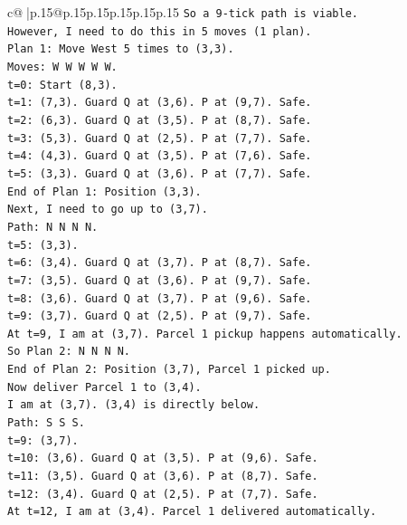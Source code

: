 \documentclass{article}
\begin{document}
{\begin{supertabular}{c@{$\;$}|p{.15\linewidth}@{}p{.15\linewidth}p{.15\linewidth}p{.15\linewidth}p{.15\linewidth}p{.15\linewidth}}
{{{\texttt{So a 9{-}tick path is viable.} \\
\texttt{However, I need to do this in 5 moves (1 plan).} \\
\texttt{Plan 1: Move West 5 times to (3,3).} \\
\texttt{Moves: W W W W W.} \\
\texttt{t=0: Start (8,3).} \\
\texttt{t=1: (7,3). Guard Q at (3,6). P at (9,7). Safe.} \\
\texttt{t=2: (6,3). Guard Q at (3,5). P at (8,7). Safe.} \\
\texttt{t=3: (5,3). Guard Q at (2,5). P at (7,7). Safe.} \\
\texttt{t=4: (4,3). Guard Q at (3,5). P at (7,6). Safe.} \\
\texttt{t=5: (3,3). Guard Q at (3,6). P at (7,7). Safe.} \\
\texttt{End of Plan 1: Position (3,3).} \\
\texttt{Next, I need to go up to (3,7).} \\
\texttt{Path: N N N N.} \\
\texttt{t=5: (3,3).} \\
\texttt{t=6: (3,4). Guard Q at (3,7). P at (8,7). Safe.} \\
\texttt{t=7: (3,5). Guard Q at (3,6). P at (9,7). Safe.} \\
\texttt{t=8: (3,6). Guard Q at (3,7). P at (9,6). Safe.} \\
\texttt{t=9: (3,7). Guard Q at (2,5). P at (9,7). Safe.} \\
\texttt{At t=9, I am at (3,7). Parcel 1 pickup happens automatically.} \\
\texttt{So Plan 2: N N N N.} \\
\texttt{End of Plan 2: Position (3,7), Parcel 1 picked up.} \\
\texttt{Now deliver Parcel 1 to (3,4).} \\
\texttt{I am at (3,7). (3,4) is directly below.} \\
\texttt{Path: S S S.} \\
\texttt{t=9: (3,7).} \\
\texttt{t=10: (3,6). Guard Q at (3,5). P at (9,6). Safe.} \\
\texttt{t=11: (3,5). Guard Q at (3,6). P at (8,7). Safe.} \\
\texttt{t=12: (3,4). Guard Q at (2,5). P at (7,7). Safe.} \\
\texttt{At t=12, I am at (3,4). Parcel 1 delivered automatically.} \\
}}}
\end{supertabular}}
\end{document}

